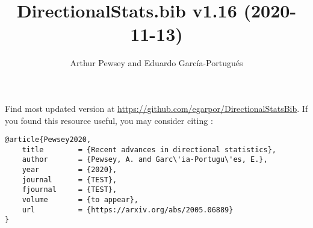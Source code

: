 \documentclass[10pt]{article}
\title{DirectionalStats.bib v1.16 (2020-11-13)}
\author{Arthur Pewsey and Eduardo García-Portugués}
\date{}
\begin{document}
\maketitle

Find most updated version at \url{https://github.com/egarpor/DirectionalStatsBib}. If you found this resource useful, you may consider citing \cite{Pewsey2020}:
\begin{verbatim}
@article{Pewsey2020,
    title        = {Recent advances in directional statistics},
    author       = {Pewsey, A. and Garc\'ia-Portugu\'es, E.},
    year         = {2020},
    journal      = {TEST},
    fjournal     = {TEST},
    volume       = {to appear},
    url          = {https://arxiv.org/abs/2005.06889}
}
\end{verbatim}

\nocite{*}

\setlength\bibsep{0cm}
\setlength\bibhang{0.25cm}



\end{document}
